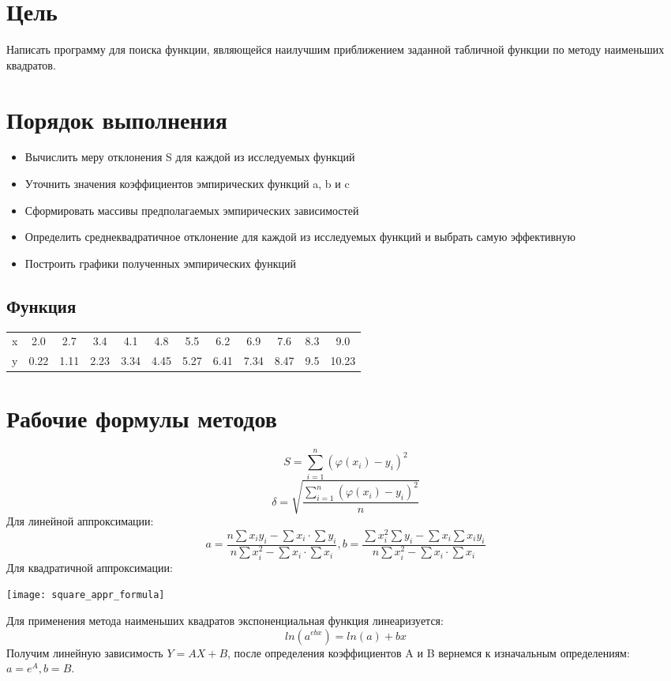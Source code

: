 \documentclass[12pt, a4paper]{article}
\begin{document}


\section*{Цель}
Написать программу для поиска функции, являющейся наилучшим приближением заданной
табличной функции по методу наименьших квадратов.

\section*{Порядок выполнения}
\begin{itemize}
  \item Вычислить меру отклонения S для каждой из исследуемых функций
  \item Уточнить значения коэффициентов эмпирических функций a, b и c
  \item Сформировать массивы предполагаемых эмпирических зависимостей
  \item Определить среднеквадратичное отклонение для каждой из исследуемых
    функций и выбрать самую эффективную
  \item Построить графики полученных эмпирических функций
\end{itemize}

\subsection*{Функция} 
\begin{center}
  \begin{tabular}{c c c c c c c c c c c c}
    x & 2.0 & 2.7 & 3.4 & 4.1 & 4.8 & 5.5 & 6.2 & 6.9 & 7.6 & 8.3 & 9.0 \\
    y & 0.22 & 1.11 & 2.23 & 3.34 & 4.45 & 5.27 & 6.41 & 7.34 & 8.47 & 9.5 & 10.23
  \end{tabular}
\end{center}
\section*{Рабочие формулы методов}
\[S = \sum_{i=1}^n (\varphi(x_i) - y_i)^2\] 
\[\delta = \sqrt{\frac{\sum_{i=1}^n (\varphi(x_i) - y_i)^2}{n}}\]
Для линейной аппроксимации:
\[a = \frac{n\sum x_i y_i - \sum x_i \cdot \sum y_i}{n\sum x_i^2 - \sum x_i \cdot \sum x_i}, b = \frac{\sum x_i^2 \sum y_i - \sum x_i \sum x_i y_i}{n\sum x_i^2 - \sum x_i \cdot \sum x_i}\]
Для квадратичной аппроксимации:
\begin{center}
  \texttt{[image: square\_appr\_formula]}
\end{center}
Для применения метода наименьших квадратов экспоненциальная функция линеаризуется:
\[ln(a^{ebx}) = ln(a) + bx\]
Получим линейную зависимость $Y = AX + B$, после определения коэффициентов A и B
вернемся к изначальным определениям: $a = e^A, b = B$.
\end{document}
